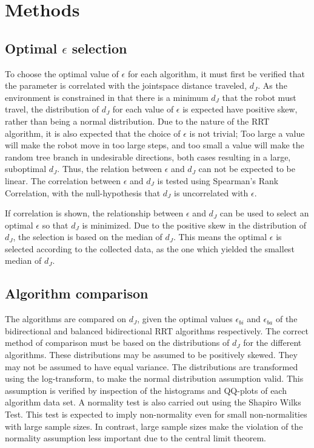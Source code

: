 \section{Methods}
\subsection{Optimal \(\epsilon\) selection}
To choose the optimal value of \(\epsilon\) for each algorithm,
it must first be verified that the parameter is correlated
with the jointspace distance traveled, \(d_J\).
As the environment is constrained in that there is a minimum \(d_J\)
that the robot must travel, the distribution of \(d_J\) for each
value of \(\epsilon\) is expected have positive skew,
rather than being a normal distribution.
Due to the nature of the RRT algorithm, it is also expected that
the choice of \(\epsilon\) is not trivial;
Too large a value will make the robot move in too large steps,
and too small a value will make the random tree branch in
undesirable directions, both cases resulting in a large, suboptimal \(d_J\).
Thus, the relation between \(\epsilon\) and \(d_J\) can not be expected to be linear.
The correlation between \(\epsilon\) and \(d_J\) is tested using
Spearman's Rank Correlation, with the null-hypothesis that \(d_J\)
is uncorrelated with \(\epsilon\).

If correlation is shown, the relationship
between \(\epsilon\) and \(d_J\) can be used
to select an optimal \(\epsilon\) so that
\(d_J\) is minimized.
Due to the positive skew in the distribution
of \(d_J\), the selection is based on the median
of \(d_J\).
This means the optimal \(\epsilon\) is selected
according to the collected data,
as the one which yielded the smallest median of \(d_J\).

\subsection{Algorithm comparison}
The algorithms are compared on \(d_J\),
given the optimal values \(\epsilon_{bi}\) and \(\epsilon_{ba}\)
of the bidirectional and balanced bidirectional RRT algorithms respectively.
The correct method of comparison must be based
on the distributions of \(d_J\) for the different algorithms.
These distributions may be assumed to be positively skewed.
They may not be assumed to have equal variance.
The distributions are transformed using the log-transform,
to make the normal distribution assumption valid.
This assumption is verified by inspection of the histograms
and QQ-plots of each algorithm data set.
A normality test is also carried out using the Shapiro Wilks Test.
This test is expected to imply non-normality even for small
non-normalities with large sample sizes. In contrast,
large sample sizes make the violation of the normality assumption
less important due to the central limit theorem.

